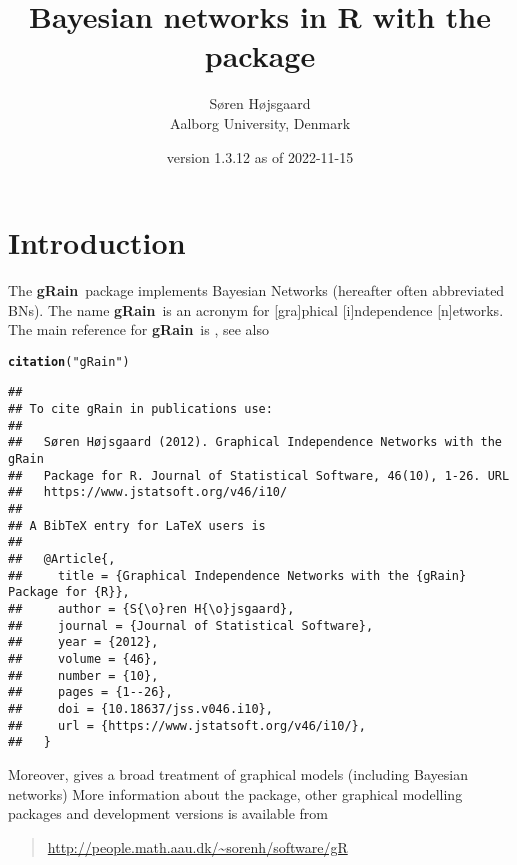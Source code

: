 \documentclass[10pt]{article}\usepackage[]{graphicx}\usepackage[]{xcolor}
\author{S{\o}ren H{\o}jsgaard\\Aalborg University, Denmark}
\title{Bayesian networks in R with the \pkg{gRain} package}
\date{\pkg{gRain} version 1.3.12 as of 2022-11-15}
\makeatletter
\newcommand{\hlstr}[1]{\textcolor[rgb]{0.192,0.494,0.8}{#1}}%
\newcommand{\hlstd}[1]{\textcolor[rgb]{0.345,0.345,0.345}{#1}}%
\newcommand{\hlkwd}[1]{\textcolor[rgb]{0.737,0.353,0.396}{\textbf{#1}}}%
\newenvironment{kframe}{%
 \def\at@end@of@kframe{}%
 \ifinner\ifhmode%
  \def\at@end@of@kframe{\end{minipage}}%
  \begin{minipage}{\columnwidth}%
 \fi\fi%
 \def\FrameCommand##1{\hskip\@totalleftmargin \hskip-\fboxsep
 \colorbox{shadecolor}{##1}\hskip-\fboxsep
     \hskip-\linewidth \hskip-\@totalleftmargin \hskip\columnwidth}%
 \MakeFramed {\advance\hsize-\width
   \@totalleftmargin\z@ \linewidth\hsize
   \@setminipage}}%
 {\par\unskip\endMakeFramed%
 \at@end@of@kframe}
\newenvironment{knitrout}{}{} %
\def\grbn{{\bf gRain}}
\makeatother
\begin{document}
\maketitle
\tableofcontents
\parindent0pt\parskip5pt

\section{Introduction}

The \grbn\ package implements Bayesian Networks (hereafter often
abbreviated BNs). The name \grbn\ is an acronym for [gra]phical
[i]ndependence [n]etworks. The main reference for \grbn\  is
\cite{hoj:12}, see also

\begin{knitrout}
\color{fgcolor}\begin{kframe}
\begin{alltt}
\hlkwd{citation}\hlstd{(}\hlstr{"gRain"}\hlstd{)}
\end{alltt}
\begin{verbatim}
## 
## To cite gRain in publications use:
## 
##   Søren Højsgaard (2012). Graphical Independence Networks with the gRain
##   Package for R. Journal of Statistical Software, 46(10), 1-26. URL
##   https://www.jstatsoft.org/v46/i10/
## 
## A BibTeX entry for LaTeX users is
## 
##   @Article{,
##     title = {Graphical Independence Networks with the {gRain} Package for {R}},
##     author = {S{\o}ren H{\o}jsgaard},
##     journal = {Journal of Statistical Software},
##     year = {2012},
##     volume = {46},
##     number = {10},
##     pages = {1--26},
##     doi = {10.18637/jss.v046.i10},
##     url = {https://www.jstatsoft.org/v46/i10/},
##   }
\end{verbatim}
\end{kframe}
\end{knitrout}

Moreover, \cite{hoj:edw:lau:12} gives a broad treatment of graphical
models (including Bayesian networks) More information about the
package, other graphical modelling packages and development versions
is available from

\begin{quote}
\url{http://people.math.aau.dk/~sorenh/software/gR}
\end{quote}

\end{document}
